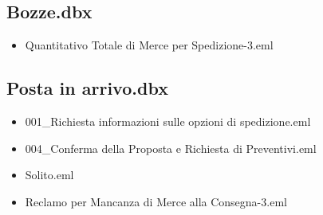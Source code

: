 \subsection{Bozze.dbx}
\begin{itemize}
    \item Quantitativo Totale di Merce per Spedizione-3.eml
\end{itemize}

\subsection{Posta in arrivo.dbx}
\begin{itemize}
    \item 001\_Richiesta informazioni sulle opzioni di spedizione.eml
    \item 004\_Conferma della Proposta e Richiesta di Preventivi.eml
    \item Solito.eml
    \item Reclamo per Mancanza di Merce alla Consegna-3.eml
\end{itemize}